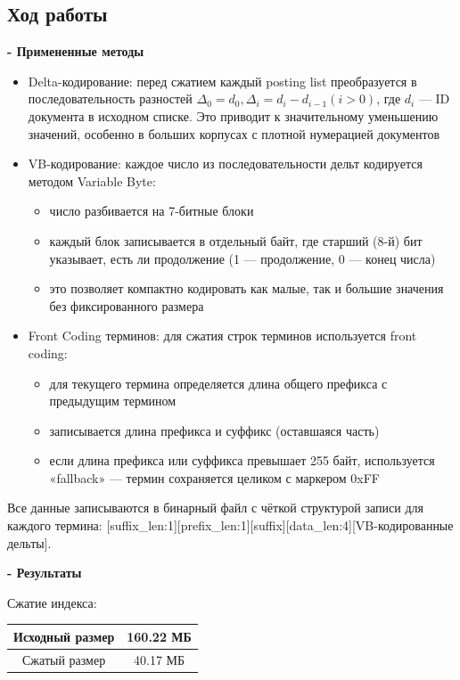 \documentclass[pdf, unicode, 12pt, a4paper, oneside, fleqn]{article}
\begin{document}
\subsection*{Ход работы}

\textbf{- Примененные методы}
\begin{itemize}
    \item Delta-кодирование: перед сжатием каждый posting list преобразуется в последовательность разностей $\Delta_0=d_0, \Delta_i=d_i-d_{i-1} (i>0)$, где $d_i$ —  ID документа в исходном списке. Это приводит к значительному уменьшению значений, особенно в больших корпусах с плотной нумерацией документов
    \item VB-кодирование: каждое число из последовательности дельт кодируется методом Variable Byte:
    \begin{itemize}
        \item число разбивается на 7-битные блоки
        \item каждый блок записывается в отдельный байт, где старший (8-й) бит указывает, есть ли продолжение (1 — продолжение, 0 — конец числа)
        \item это позволяет компактно кодировать как малые, так и большие значения без фиксированного размера
    \end{itemize}
    \item Front Coding терминов: для сжатия строк терминов используется front coding:
    \begin{itemize}
        \item для текущего термина определяется длина общего префикса с предыдущим термином
        \item записывается длина префикса и суффикс (оставшаяся часть)
        \item если длина префикса или суффикса превышает 255 байт, используется «fallback» — термин сохраняется целиком с маркером 0xFF
    \end{itemize}
\end{itemize}
Все данные записываются в бинарный файл с чёткой структурой записи для каждого термина: [suffix\_len:1][prefix\_len:1][suffix][data\_len:4][VB-кодированные дельты].

\textbf{- Результаты} 

Сжатие индекса:

\begin{center}
\begin{tabular}{ |c|c| }
\hline
 Исходный размер & 160.22 МБ \\
 \hline
 Сжатый размер & 40.17 МБ \\
 \hline
\end{tabular}
\end{center} 
\end{document}
